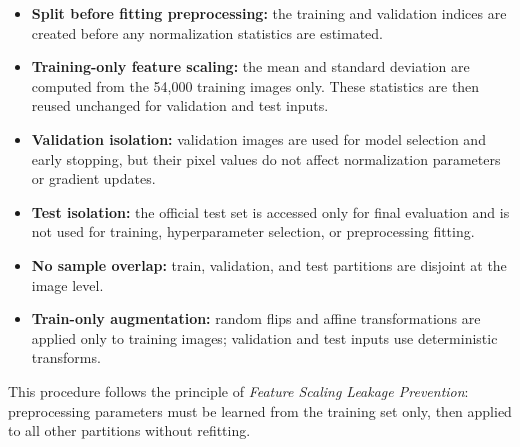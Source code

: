     \begin{itemize}
        \item \textbf{Split before fitting preprocessing:} the training and validation indices are created before any normalization statistics are estimated.
        \item \textbf{Training-only feature scaling:} the mean and standard deviation are computed from the 54,000 training images only. These statistics are then reused unchanged for validation and test inputs.
        \item \textbf{Validation isolation:} validation images are used for model selection and early stopping, but their pixel values do not affect normalization parameters or gradient updates.
        \item \textbf{Test isolation:} the official test set is accessed only for final evaluation and is not used for training, hyperparameter selection, or preprocessing fitting.
        \item \textbf{No sample overlap:} train, validation, and test partitions are disjoint at the image level.
        \item \textbf{Train-only augmentation:} random flips and affine transformations are applied only to training images; validation and test inputs use deterministic transforms.
    \end{itemize}

    This procedure follows the principle of \emph{Feature Scaling Leakage Prevention}: preprocessing parameters must be learned from the training set only, then applied to all other partitions without refitting.
